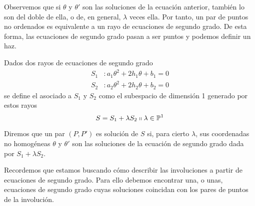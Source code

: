 Observemos que si $\theta$ y $\theta'$ son las soluciones de la ecuación anterior, también lo son del doble de ella, o de, en general, $\lambda$ veces ella. Por tanto, un par de puntos no ordenados es equivalente a un rayo de ecuaciones de segundo grado. De esta forma, las ecuaciones de segundo grado pasan a ser puntos y podemos definir un haz.
\begin{defi} Dados dos rayos de ecuaciones de segundo grado
\begin{equation}
	\begin{split}
		S_1&:a_1\theta^2+2h_1\theta+b_1=0\\
		S_2&:a_2\theta^2+2h_2\theta+b_2=0
	\end{split}
\end{equation}
se define el  asociado a $S_1$ y $S_2$ como el subespacio de dimensión 1 generado por estos rayos
\begin{equation}
	S=S_1+\lambda S_2 \shortparallel \lambda\in\mathbb{P}^1
\end{equation}
\end{defi}
Diremos que un par $(P,P')$ es solución de $S$ si, para cierto $\lambda$, sus coordenadas no homogéneas $\theta$ y $\theta'$ son las soluciones de la ecuación de segundo grado dada por $S_1+\lambda S_2$.

Recordemos que estamos buscando cómo describir las involuciones a partir de ecuaciones de segundo grado. Para ello debemos encontrar una, o unas, ecuaciones de segundo grado cuyas soluciones coincidan con los pares de puntos de la involución.


